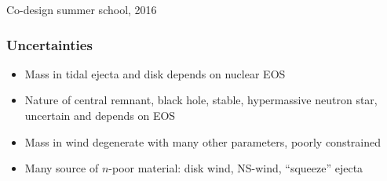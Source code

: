 \documentclass[]{beamer}
\begin{document}
\begin{frame}
\begin{columns}
\begin{column}{6cm}
\begin{center}
{
        }
      \end{center}
    \end{column}
  \end{columns}
  \begin{tiny}
    Co-design summer school, 2016
  \end{tiny}
\end{frame}

\begin{frame}
  \frametitle{Uncertainties}
  \begin{itemize}
  \item Mass in tidal ejecta and disk depends on nuclear EOS
  \item Nature of central remnant, black hole, stable, hypermassive
    neutron star, uncertain and depends on EOS
  \item Mass in wind degenerate with many other parameters, poorly constrained
  \item Many source of $n$-poor material: disk wind, NS-wind, ``squeeze'' ejecta
  \end{itemize}
\end{frame}

% 
\end{document}
